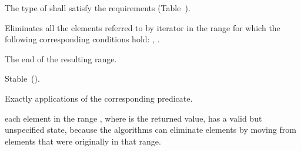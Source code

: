 \begin{itemdescr}
\begin{removedblock}
\pnum
\requires
The type of
shall satisfy the 
requirements (Table~).
\end{removedblock}

\pnum
\effects
Eliminates all the elements referred to by iterator
in the range 
for which the following corresponding conditions hold:
,
.

\pnum
\returns
The end of the resulting range.

\pnum
\remarks Stable~().

\pnum
\complexity
Exactly
applications of the corresponding predicate.

\pnum
\realnote each element in the range , where  is
the returned value, has a valid but unspecified state, because the algorithms
can eliminate elements by moving from elements that were originally
in that range.
\end{itemdescr}

